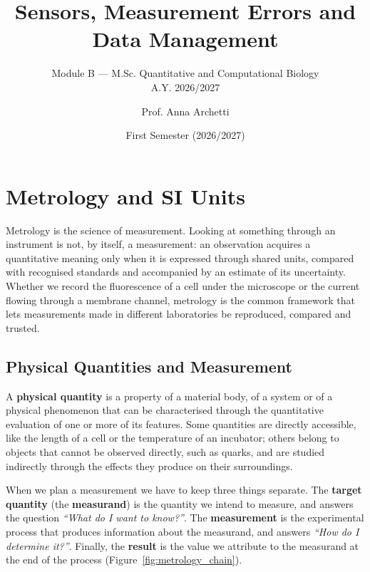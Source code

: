 \documentclass[letterpaper,11pt,leqno]{book}
\begin{document}
\title{Sensors, Measurement Errors and Data Management}
\subtitle{Module B --- M.Sc. Quantitative and Computational Biology\\A.Y. 2026/2027}
\author{Prof. Anna Archetti}
\date{First Semester (2026/2027)}

\begin{titlepage}
\maketitle
\end{titlepage}

\frontmatter
\tableofcontents

\mainmatter
\chapter{Metrology and SI Units}
\label{ch:metrology}

Metrology is the science of measurement. Looking at something through an instrument is not, by itself, a measurement: an observation acquires a quantitative meaning only when it is expressed through shared units, compared with recognised standards and accompanied by an estimate of its uncertainty. Whether we record the fluorescence of a cell under the microscope or the current flowing through a membrane channel, metrology is the common framework that lets measurements made in different laboratories be reproduced, compared and trusted.

\section{Physical Quantities and Measurement}
\label{sec:physical_quantities}

A \textbf{physical quantity} is a property of a material body, of a system or of a physical phenomenon that can be characterised through the quantitative evaluation of one or more of its features. Some quantities are directly accessible, like the length of a cell or the temperature of an incubator; others belong to objects that cannot be observed directly, such as quarks, and are studied indirectly through the effects they produce on their surroundings.

When we plan a measurement we have to keep three things separate. The \textbf{target quantity} (the \textbf{measurand}) is the quantity we intend to measure, and answers the question \emph{``What do I want to know?''}. The \textbf{measurement} is the experimental process that produces information about the measurand, and answers \emph{``How do I determine it?''}. Finally, the \textbf{result} is the value we attribute to the measurand at the end of the process (Figure~\ref{fig:metrology_chain}).
\end{document}
